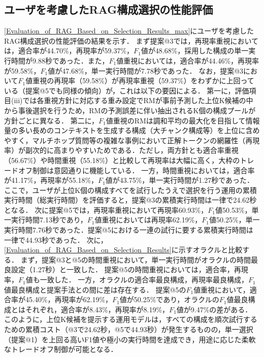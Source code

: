 \subsection{ユーザを考慮したRAG構成選択の性能評価} \label{sec5.3}
\ref{Evaluation_of_RAG_Based_on_Selection_Results_max}にユーザを考慮したRAG構成選択の性能評価の結果を示す．
まず提案@3では，再現率重視においては，適合率が44.70\%，再現率が59.37\%，$F_1$値が48.68\%，採用した構成の単一実行時間が9.88秒であった．また，$F_1$値重視においては，適合率が44.46\%，再現率が59.58\%，$F_1$値が47.68\%，単一実行時間が7.78秒であった．
なお，提案@3において$F_1$値重視の再現率（59.58\%）が再現率重視（59.37\%）をわずかに上回っている（提案@5でも同様の傾向）が，これは以下の要因による．
第一に，評価項目(iii)では各重視方針に対応する重み設定でRMが事前予測した上位K候補の中から事後選択を行うため，RMの予測誤差に伴い抽出されるK個の構成プールが方針ごとに異なる．
第二に，$F_1$値重視のRMは調和平均の最大化を目指して情報量の多い長めのコンテキストを生成する構成（大チャンク構成等）を上位に含めやすく，マルチホップ質問等の複雑な事例において正解トークンの網羅性（再現率）が副次的に高まりやすいためである．ただし，両方針とも適合率重視（56.67\%）や時間重視（55.18\%）と比較して再現率は大幅に高く，大枠のトレードオフ制御は意図通りに機能している．
一方，時間重視においては，適合率が41.17\%，再現率が55.18\%，$F_1$値が43.75\%，単一実行時間が1.27秒であった．
ここで，ユーザが上位K個の構成すべてを試行したうえで選択を行う運用の累積実行時間（総実行時間）を評価すると，提案@3の累積実行時間は一律で24.62秒となる．
次に提案@5では，再現率重視において再現率60.93\%，$F_1$値50.53\%，単一実行時間7.13秒であり，$F_1$値重視においては再現率62.19\%，$F_1$値50.25\%，単一実行時間7.76秒であった．提案@5における一連の試行に要する累積実行時間は一律で44.93秒であった．
次に，\ref{Evaluation_of_RAG_Based_on_Selection_Results}に示すオラクルと比較する． 
まず，提案@3と@5の時間重視において，単一実行時間がオラクルの時間最良設定（1.27秒）と一致した．
提案@5の時間重視においては，適合率，再現率，$F_1$値も一致した．
一方，オラクルの適合率最良構成，再現率最良構成，$F_1$値最良構成と提案手法との間に差は存在する．
提案@5の$F_1$値重視において，適合率が45.40\%，再現率が62.19\%，$F_1$値が50.25\%であり，オラクルの$F_1$値最良構成とはそれぞれ，適合率が8.43\%，再現率が8.19\%，$F_1$値が9.47\%の差がある．
このように，上位K候補を提示する運用モデルは，すべての構成を順次試行するための累積コスト（@3で24.62秒，@5で44.93秒）が発生するものの，単一選択（提案@1）を上回る高いF1値や極小の実行時間を達成でき，用途に応じた柔軟なトレードオフ制御が可能となる．

